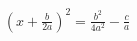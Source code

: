 \documentclass[preview]{standalone}
\begin{document}
\begin{align*}
\left ( x + \frac{b}{2a} \right )^{2} = \frac{b^{2}}{4a^{2}} - \frac{c}{a}
\end{align*}
\end{document}

